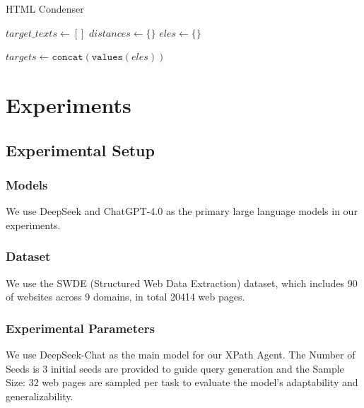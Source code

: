 \documentclass[a4paper]{article}
\begin{document}
\begin{algorithm}
  \SetAlgoLined
  \caption{HTML Condenser}
  
  $target\_texts \gets []$\;
  $distances \gets \{\}$\;
  $eles \gets \{\}$\;
  

  $targets \gets \texttt{concat}(\texttt{values}(eles))$\;

\end{algorithm}

\section{Experiments }

\subsection{Experimental Setup}

\subsubsection{Models}
We use DeepSeek and ChatGPT-4.0 as the primary large language models in our experiments.

\subsubsection{Dataset}
We use the SWDE \cite{abdin2024phi3technicalreporthighly} (Structured Web Data Extraction) dataset, which includes 90 of websites across 9 domains, in total 20414 web pages.

\subsubsection{Experimental Parameters}
We use DeepSeek-Chat as the main model for our XPath Agent. The Number of Seeds is 3 initial seeds are provided to guide query generation and the 
Sample Size: 32 web pages are sampled per task to evaluate the model’s adaptability and generalizability.
\end{document}
